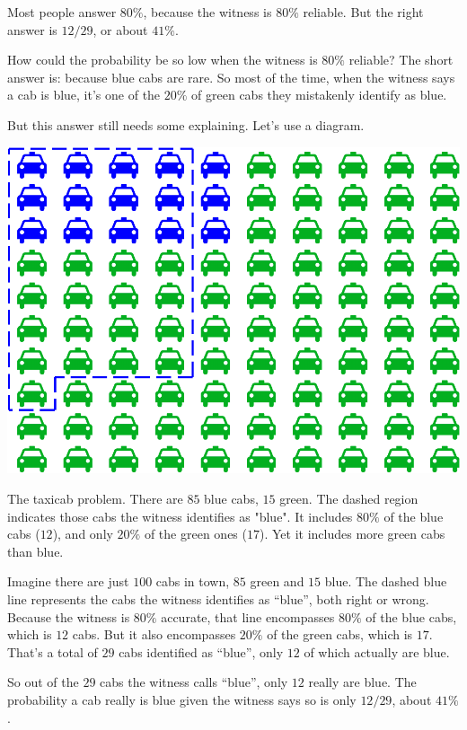 \documentclass[justified]{tufte-book}
\theoremstyle{definition}
\theoremstyle{definition}
\theoremstyle{definition}
\theoremstyle{remark}
\begin{document}
Most people answer \(80\%\), because the witness is \(80\%\) reliable.
But the right answer is \(12/29\), or about \(41\%\).

How could the probability be so low when the witness is \(80\%\)
reliable? The short answer is: because blue cabs are rare. So most of
the time, when the witness says a cab is blue, it's one of the \(20\%\)
of green cabs they mistakenly identify as blue.

But this answer still needs some explaining. Let's use a diagram.

\begin{marginfigure}
\includegraphics{_main_files/figure-latex/taxigrid-1} \caption[The taxicab problem]{The taxicab problem. There are $85$ blue cabs, $15$ green. The dashed region indicates those cabs the witness identifies as "blue". It includes $80\%$ of the blue cabs ($12$), and only $20\%$ of the green ones ($17$). Yet it includes more green cabs than blue.}\label{fig:taxigrid}
\end{marginfigure}

Imagine there are just \(100\) cabs in town, \(85\) green and \(15\)
blue. The dashed blue line represents the cabs the witness identifies as
``blue'', both right or wrong. Because the witness is \(80\%\) accurate,
that line encompasses \(80\%\) of the blue cabs, which is \(12\) cabs.
But it also encompasses \(20\%\) of the green cabs, which is \(17\).
That's a total of \(29\) cabs identified as ``blue'', only \(12\) of
which actually are blue.

So out of the \(29\) cabs the witness calls ``blue'', only \(12\) really
are blue. The probability a cab really is blue given the witness says so
is only \(12/29\), about \(41\%\).
\end{document}
